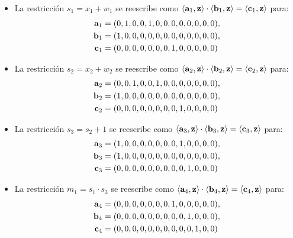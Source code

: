 \begin{itemize}
	\item La restricción $s_1 = x_1 + w_1$ se reescribe como $\left\langle \mathbf{a}_1, \mathbf{z} \right\rangle \cdot \left\langle \mathbf{b}_1, \mathbf{z} \right\rangle = \left\langle \mathbf{c}_1, \mathbf{z} \right\rangle$ para:
	$$\begin{aligned}
		\mathbf{a}_1 &= (0, 1, 0, 0, 1, 0, 0, 0, 0, 0, 0, 0, 0), \\
		\mathbf{b}_1 &= (1, 0, 0, 0, 0, 0, 0, 0, 0, 0, 0, 0, 0), \\
		\mathbf{c}_1 &= (0, 0, 0, 0, 0, 0, 0, 1, 0, 0, 0, 0, 0)
	\end{aligned}$$
	\item La restricción $s_2 = x_2 + w_2$ se reescribe como $\left\langle \mathbf{a}_2, \mathbf{z} \right\rangle \cdot \left\langle \mathbf{b}_2, \mathbf{z} \right\rangle = \left\langle \mathbf{c}_2, \mathbf{z} \right\rangle$ para:
	$$\begin{aligned}
		\mathbf{a}_2 &= (0, 0, 1, 0, 0, 1, 0, 0, 0, 0, 0, 0, 0), \\
		\mathbf{b}_2 &= (1, 0, 0, 0, 0, 0, 0, 0, 0, 0, 0, 0, 0), \\
		\mathbf{c}_2 &= (0, 0, 0, 0, 0, 0, 0, 0, 1, 0, 0, 0, 0)
	\end{aligned}$$
	\item La restricción $s_3 = s_2 + 1$ se reescribe como $\left\langle \mathbf{a}_3, \mathbf{z} \right\rangle \cdot \left\langle \mathbf{b}_3, \mathbf{z} \right\rangle = \left\langle \mathbf{c}_3, \mathbf{z} \right\rangle$ para:
	$$\begin{aligned}
		\mathbf{a}_3 &= (1, 0, 0, 0, 0, 0, 0, 0, 1, 0, 0, 0, 0), \\
		\mathbf{b}_3 &= (1, 0, 0, 0, 0, 0, 0, 0, 0, 0, 0, 0, 0), \\
		\mathbf{c}_3 &= (0, 0, 0, 0, 0, 0, 0, 0, 0, 1, 0, 0, 0)
	\end{aligned}$$
	\item La restricción $m_1 = s_1 \cdot s_3$ se reescribe como $\left\langle \mathbf{a}_4, \mathbf{z} \right\rangle \cdot \left\langle \mathbf{b}_4, \mathbf{z} \right\rangle = \left\langle \mathbf{c}_4, \mathbf{z} \right\rangle$ para:
	$$\begin{aligned}
		\mathbf{a}_4 &= (0, 0, 0, 0, 0, 0, 0, 1, 0, 0, 0, 0, 0), \\
		\mathbf{b}_4 &= (0, 0, 0, 0, 0, 0, 0, 0, 0, 1, 0, 0, 0), \\
		\mathbf{c}_4 &= (0, 0, 0, 0, 0, 0, 0, 0, 0, 0, 1, 0, 0)
	\end{aligned}$$

\end{itemize}
